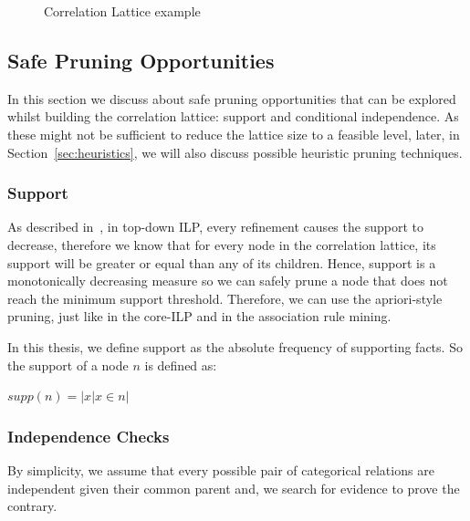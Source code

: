 \begin{figure}[!h]
  \caption{Correlation Lattice example}
  \centering
  \begin{tikzpicture}
  [scale=1.8,auto=center,every node/.style={draw=black, font=\tiny}]
  
  \end{tikzpicture}
  \label{fig:lattice}
\end{figure}

\subsection{Safe Pruning Opportunities}

In this section we discuss about safe pruning opportunities that can be explored whilst building the correlation
lattice: support and conditional independence. As these might not be sufficient to reduce the lattice size to a feasible
level, later, in Section~\ref{sec:heuristics}, we will also discuss possible heuristic pruning techniques.

\subsubsection{Support}

As described in~\cite{LavracDz94}, in top-down ILP, every refinement causes the support to decrease, therefore we
know that for every node in the correlation lattice, its support will be greater or equal than any of its children.
Hence, support is a monotonically decreasing measure so we can safely prune a node that does not reach the
minimum support threshold. Therefore, we can use the apriori-style pruning, just like in the core-ILP and in the
association rule
mining.

In this thesis, we define support as the absolute frequency of supporting facts. So the support of a node $n$ is
defined as:

\begin{center}
$supp(n)=|{x|x \in n}|$ 
\end{center}


\subsubsection{Independence Checks}
\label{sec:indepchecks}

By simplicity, we assume that every possible pair of categorical relations are independent given their common parent
and, we search for evidence to prove the contrary.

